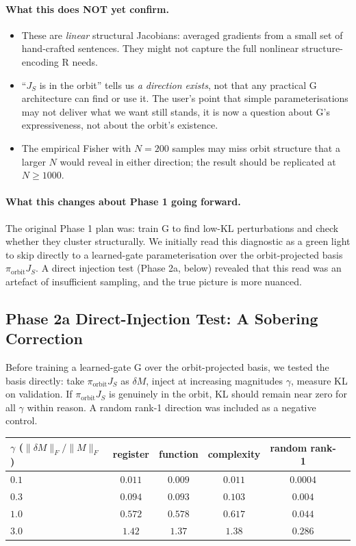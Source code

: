 \documentclass[11pt, a4paper]{article}
\theoremstyle{plain}
\theoremstyle{definition}
\theoremstyle{remark}
\begin{document}
\paragraph{What this does NOT yet confirm.}
\begin{itemize}[nosep]
\item These are \emph{linear} structural Jacobians: averaged gradients from a small set of hand-crafted sentences. They might not capture the full nonlinear structure-encoding R needs.
\item ``$J_S$ is in the orbit'' tells us \emph{a direction exists}, not that any practical G architecture can find or use it. The user's point that simple parameterisations may not deliver what we want still stands, it is now a question about G's expressiveness, not about the orbit's existence.
\item The empirical Fisher with $N=200$ samples may miss orbit structure that a larger $N$ would reveal in either direction; the result should be replicated at $N \geq 1000$.
\end{itemize}

\paragraph{What this changes about Phase 1 going forward.}
The original Phase 1 plan was: train G to find low-KL perturbations and check whether they cluster structurally.
We initially read this diagnostic as a green light to skip directly to a learned-gate parameterisation over the orbit-projected basis $\pi_{\text{orbit}} J_S$.
A direct injection test (Phase 2a, below) revealed that this read was an artefact of insufficient sampling, and the true picture is more nuanced.

\subsection{Phase 2a Direct-Injection Test: A Sobering Correction}
\label{sec:phase2a-correction}

Before training a learned-gate G over the orbit-projected basis, we tested the basis directly: take $\pi_{\text{orbit}} J_S$ as $\delta M$, inject at increasing magnitudes $\gamma$, measure KL on validation.
If $\pi_{\text{orbit}} J_S$ is genuinely in the orbit, KL should remain near zero for all $\gamma$ within reason.
A random rank-1 direction was included as a negative control.

\begin{center}
\begin{tabular}{l c c c c c}
\toprule
$\gamma$ ($\| \delta M \|_F / \| M \|_F$) & register & function & complexity & random rank-1 \\
\midrule
$0.1$ & $0.011$ & $0.009$ & $0.011$ & $\mathbf{0.0004}$ \\
$0.3$ & $0.094$ & $0.093$ & $0.103$ & $\mathbf{0.004}$ \\
$1.0$ & $0.572$ & $0.578$ & $0.617$ & $\mathbf{0.044}$ \\
$3.0$ & $1.42$ & $1.37$ & $1.38$ & $\mathbf{0.286}$ \\
\bottomrule
\end{tabular}
\end{center}
\end{document}

